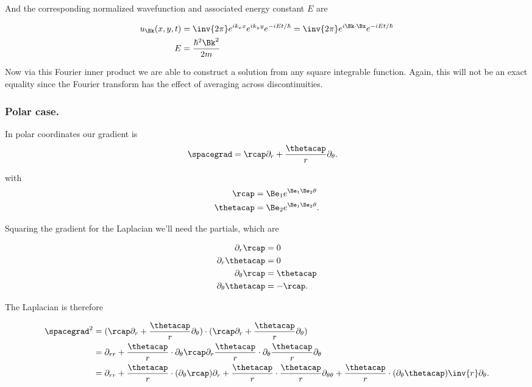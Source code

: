 And the corresponding normalized wavefunction and associated energy constant $E$ are

\begin{align}\label{eqn:desaiCh4:116}
u_{\Bk}(x,y,t) 
&= \inv{2\pi}
e^{i k_x x}
e^{i k_y y}
e^{-iE t/\hbar} 
= \inv{2\pi}
e^{i \Bk \cdot \Bx}
e^{-iE t/\hbar} \\
E &= \frac{\hbar^2 \Bk^2 }{2m}
\end{align}

Now via this Fourier inner product we are able to construct a solution from any square integrable function.  Again, this will not be
an exact equality since the Fourier transform has the effect of averaging across discontinuities.

\subsubsection{Polar case.}

In polar coordinates our gradient is
\begin{align}\label{eqn:desaiCh4:140}
\spacegrad &= \rcap \partial_r + \frac{\thetacap}{r} \partial_\theta.
\end{align}

with
\begin{align}\label{eqn:desaiCh4:141}
\rcap &= \Be_1 e^{\Be_1 \Be_2 \theta} \\
\thetacap &= \Be_2 e^{\Be_1 \Be_2 \theta} .
\end{align}

Squaring the gradient for the Laplacian we'll need the partials, which are

\begin{align*}
\partial_r \rcap &= 0 \\
\partial_r \thetacap &= 0 \\
\partial_\theta \rcap &= \thetacap \\
\partial_\theta \thetacap &= -\rcap.
\end{align*}

The Laplacian is therefore

\begin{align*}
\spacegrad^2 
&= 
(\rcap \partial_r + \frac{\thetacap}{r} \partial_\theta) \cdot
(\rcap \partial_r + \frac{\thetacap}{r} \partial_\theta) \\
&= 
\partial_{rr} + 
\frac{\thetacap}{r} \cdot \partial_\theta \rcap \partial_r 
\frac{\thetacap}{r} \cdot \partial_\theta \frac{\thetacap}{r} \partial_\theta \\
&= 
\partial_{rr} 
+ \frac{\thetacap}{r} \cdot (\partial_\theta \rcap) \partial_r 
+ \frac{\thetacap}{r} \cdot \frac{\thetacap}{r} \partial_{\theta\theta} 
+ \frac{\thetacap}{r} \cdot (\partial_\theta \thetacap) \inv{r} \partial_\theta .
\end{align*}

